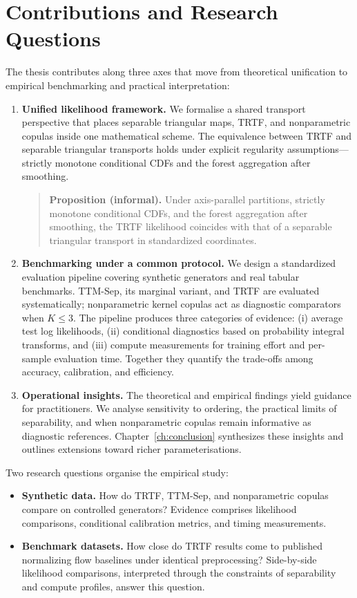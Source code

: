 \documentclass[11pt,a4paper,twoside]{book}\usepackage[]{graphicx}\usepackage[]{xcolor}
\begin{document}
\section{Contributions and Research Questions}\label{sec:ch1-contributions}

The thesis contributes along three axes that move from theoretical unification to empirical benchmarking and practical interpretation:
\begin{enumerate}
  \item \textbf{Unified likelihood framework.} We formalise a shared transport perspective that places separable triangular maps, TRTF, and nonparametric copulas inside one mathematical scheme. The equivalence between TRTF and separable triangular transports holds under explicit regularity assumptions---strictly monotone conditional CDFs and the forest aggregation after smoothing.

    \begin{quote}
    \textbf{Proposition (informal).} Under axis-parallel partitions, strictly monotone conditional CDFs, and the forest aggregation after smoothing, the TRTF likelihood coincides with that of a separable triangular transport in standardized coordinates.
    \end{quote}

  \item \textbf{Benchmarking under a common protocol.} We design a standardized evaluation pipeline covering synthetic generators and real tabular benchmarks. TTM-Sep, its marginal variant, and TRTF are evaluated systematically; nonparametric kernel copulas act as diagnostic comparators when $K \le 3$. The pipeline produces three categories of evidence: (i) average test log likelihoods, (ii) conditional diagnostics based on probability integral transforms, and (iii) compute measurements for training effort and per-sample evaluation time. Together they quantify the trade-offs among accuracy, calibration, and efficiency.

  \item \textbf{Operational insights.} The theoretical and empirical findings yield guidance for practitioners. We analyse sensitivity to ordering, the practical limits of separability, and when nonparametric copulas remain informative as diagnostic references. Chapter~\ref{ch:conclusion} synthesizes these insights and outlines extensions toward richer parameterisations.
\end{enumerate}

Two research questions organise the empirical study:
\begin{itemize}
  \item \textbf{Synthetic data.} How do TRTF, TTM-Sep, and nonparametric copulas compare on controlled generators? Evidence comprises likelihood comparisons, conditional calibration metrics, and timing measurements.
  \item \textbf{Benchmark datasets.} How close do TRTF results come to published normalizing flow baselines under identical preprocessing? Side-by-side likelihood comparisons, interpreted through the constraints of separability and compute profiles, answer this question.
\end{itemize}
\end{document}
